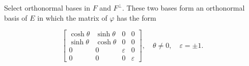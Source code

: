 Select orthonormal bases in $F$ and $F^\perp$. These two bases form an orthonormal basis of $E$ in which the matrix of $\varphi$ has the form

$$\begin{bmatrix}
\cosh \theta & \sinh \theta & 0 & 0 \\
\sinh \theta & \cosh \theta & 0 & 0 \\
0 & 0 & \varepsilon & 0 \\
0 & 0 & 0 & \varepsilon
\end{bmatrix}, \quad \theta \neq 0, \quad \varepsilon = \pm 1.$$
